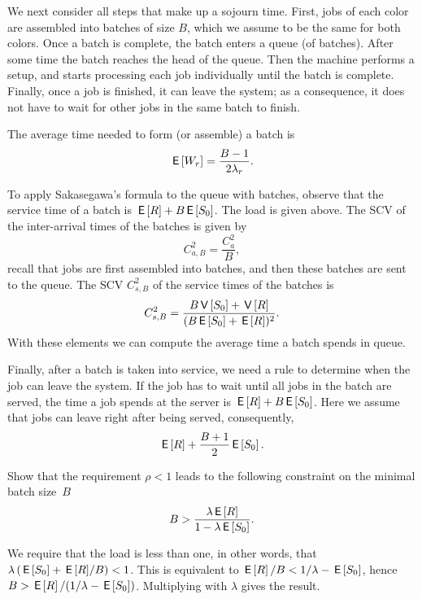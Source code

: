 We next consider all steps that make up a sojourn time.
First, jobs of each color are assembled into batches of size $B$, which we assume to be the same for both colors.
Once a batch is complete, the batch enters a queue (of batches).
After some time the batch reaches the head of the queue.
Then the machine performs a setup, and starts processing each job individually until the batch is complete.
Finally, once a job is finished, it can leave the system; as a consequence, it does not have to wait for other jobs in the same batch to finish.

The average time needed to form (or assemble) a batch is
\begin{equation}\label{eq:79}
  \,\mathsf{E}\left[W_r\right] = \frac{B-1}{2\lambda_r}.
\end{equation}

To apply Sakasegawa's formula to the queue with batches, observe that the service time of a batch is $\,\mathsf{E}\left[R\right] + B\,\mathsf{E}\left[S_0\right]$.
The load is given above.
The SCV of the inter-arrival times of the batches is given by
 \begin{equation}\label{eq:82}
C_{a,B}^2 = \frac{C_{a}^2}B,
\end{equation}
recall that jobs are first assembled into batches, and then these batches are sent to the queue.
The SCV $C_{s,B}^2$ of the service times of the batches is 
\begin{equation}\label{eq:84}
C_{s, B}^2 = \frac{B \,\mathsf{V}\left[S_0\right] + \,\mathsf{V}\left[R\right]}{(B \,\mathsf{E}\left[S_0\right] + \,\mathsf{E}\left[R\right])^2}.
\end{equation}
With these elements we can compute the average time a batch spends in queue.

Finally, after a batch is taken into service, we need a rule to determine when the job can leave the system.
If the job has to wait until all jobs in the batch are served, the time a job spends at the server is $\,\mathsf{E}\left[R\right] + B \,\mathsf{E}\left[S_0\right]$.
Here we assume that jobs can leave right after being served, consequently,
\begin{equation}\label{eq:85}
\,\mathsf{E}\left[R\right]  + \frac{B+1}{2}\,\mathsf{E}\left[S_0\right].
\end{equation}

\begin{exercise}
Show that the requirement $\rho < 1$ leads to the following constraint on the minimal batch size~$B$ 
  \begin{equation*}
 B>\frac{\lambda \,\mathsf{E}\left[R\right]}{1-\lambda \,\mathsf{E}\left[S_0\right]}.
  \end{equation*}
  \begin{solution}
    We require that the load is less than one, in other words, that $\lambda\left(\,\mathsf{E}\left[S_0\right] + {\,\mathsf{E}\left[R\right]}/B\right) < 1$. This  is equivalent to $\,\mathsf{E}\left[R\right]/B < 1/\lambda - \,\mathsf{E}\left[S_0\right]$, hence $B > \,\mathsf{E}\left[R\right]/(1/\lambda - \,\mathsf{E}\left[S_0\right])$. Multiplying with $\lambda$ gives the result. 
  \end{solution}
\end{exercise}

